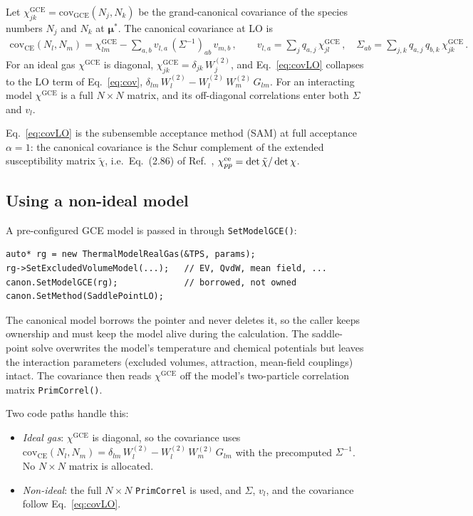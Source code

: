 \documentclass[11pt]{article}
\newcommand{\bmu}{\bm{\mu}}
\newcommand{\CE}{\mathrm{CE}}
\newcommand{\GCE}{\mathrm{GCE}}
\newcommand{\covv}{\mathrm{cov}}
\begin{document}
Let $\chi^{\GCE}_{jk} = \covv_{\GCE}(N_j, N_k)$ be the grand-canonical covariance of the species numbers $N_j$ and $N_k$ at $\bmu^*$.
The canonical covariance at LO is
\begin{align}
  \covv_\CE(N_l, N_m) = \chi^{\GCE}_{lm} - \sum_{a,b} v_{l,a}\,(\Sigma^{-1})_{ab}\,v_{m,b} \,,
  \qquad
  v_{l,a} = \sum_j q_{a,j}\,\chi^{\GCE}_{jl} \,,
  \quad
  \Sigma_{ab} = \sum_{j,k} q_{a,j}\,q_{b,k}\,\chi^{\GCE}_{jk} \,.
  \label{eq:covLO}
\end{align}
For an ideal gas $\chi^{\GCE}$ is diagonal, $\chi^{\GCE}_{jk} = \delta_{jk}\,W_j^{(2)}$, and Eq.~\eqref{eq:covLO} collapses to the LO term of Eq.~\eqref{eq:cov}, $\delta_{lm}\,W_l^{(2)} - W_l^{(2)}\,W_m^{(2)}\,G_{lm}$.
For an interacting model $\chi^{\GCE}$ is a full $N\times N$ matrix, and its off-diagonal correlations enter both $\Sigma$ and $v_l$.

Eq.~\eqref{eq:covLO} is the subensemble acceptance method (SAM) at full acceptance $\alpha = 1$: the canonical covariance is the Schur complement of the extended susceptibility matrix $\tilde\chi$, i.e.\ Eq.~(2.86) of Ref.~\cite{SAM}, $\chi^{\rm ce}_{pp} = \det\tilde\chi/\det\chi$.

\subsection{Using a non-ideal model}

A pre-configured GCE model is passed in through \texttt{SetModelGCE()}:
\begin{verbatim}
auto* rg = new ThermalModelRealGas(&TPS, params);
rg->SetExcludedVolumeModel(...);   // EV, QvdW, mean field, ...
canon.SetModelGCE(rg);             // borrowed, not owned
canon.SetMethod(SaddlePointLO);
\end{verbatim}
The canonical model borrows the pointer and never deletes it, so the caller keeps ownership and must keep the model alive during the calculation.
The saddle-point solve overwrites the model's temperature and chemical potentials but leaves the interaction parameters (excluded volumes, attraction, mean-field couplings) intact.
The covariance then reads $\chi^{\GCE}$ off the model's two-particle correlation matrix \texttt{PrimCorrel()}.

Two code paths handle this:
\begin{itemize}
  \item \emph{Ideal gas}: $\chi^{\GCE}$ is diagonal, so the covariance uses $\covv_\CE(N_l, N_m) = \delta_{lm}\,W_l^{(2)} - W_l^{(2)}\,W_m^{(2)}\,G_{lm}$ with the precomputed $\Sigma^{-1}$.  No $N\times N$ matrix is allocated.
  \item \emph{Non-ideal}: the full $N\times N$ \texttt{PrimCorrel} is used, and $\Sigma$, $v_l$, and the covariance follow Eq.~\eqref{eq:covLO}.
\end{itemize}
\end{document}
